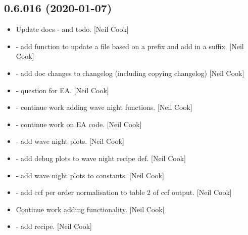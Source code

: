 \documentclass[a4paper,10pt,english]{report}
\begin{document}
\subsection{0.6.016 (2020-01-07)}
\label{\detokenize{misc/changelog:id2}}\begin{itemize}
\item {} 
Update docs -  and todo. {[}Neil Cook{]}

\item {} 
 - add function to update a
file based on a prefix and add in a suffix. {[}Neil Cook{]}

\item {} 
 - add doc changes to changelog
(including copying changelog) {[}Neil Cook{]}

\item {} 
 - question for EA. {[}Neil Cook{]}

\item {} 
 - continue work adding wave night functions.
{[}Neil Cook{]}

\item {} 
 - continue work on EA code.
{[}Neil Cook{]}

\item {} 
 - add wave night plots. {[}Neil Cook{]}

\item {} 
 - add debug plots to
wave night recipe def. {[}Neil Cook{]}

\item {} 
 - add wave night plots to
constants. {[}Neil Cook{]}

\item {} 
 - add ccf per order normalisation to table
2 of ccf output. {[}Neil Cook{]}

\item {} 
Continue work adding  functionality. {[}Neil Cook{]}

\item {} 
 - add 
recipe. {[}Neil Cook{]}


\end{itemize}
\end{document}

